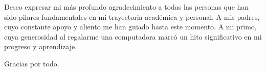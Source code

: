 \begin{comment}
	\begin{dedication}
		\setlength{\parskip}{\baselineskip}
		\lettrine[lraise=-0.1, lines=2, loversize=0.25]{D}{}edico esta tesis a DIOS, por haberme concedido la vida y la salud y permitirme terminar esta tesis símbolo de una meta cumplida; a mi esposa e hija que me alentaron a seguir adelante y aumentaron mis deseos de superación, a mi madre y hermanos que son mi apoyo moral y económico en el trayecto a mi meta.
		
		\begin{flushright}
			Gracias por todo.
		\end{flushright}
		
	\end{dedication}
\end{comment}


\begin{acknowledgements}
\setlength{\parskip}{\baselineskip}
\lettrine[lraise=-0.1, lines=2, loversize=0.25]{D}{}eseo expresar mi más profundo agradecimiento a todas las personas que han sido pilares fundamentales en mi trayectoria académica y personal. A mis padres, cuyo constante apoyo y aliento me han guiado hasta este momento. A mi primo, cuya generosidad al regalarme una computadora marcó un hito significativo en mi progreso y aprendizaje.
\begin{flushright}
	Gracias por todo.
\end{flushright}

 
\end{acknowledgements}